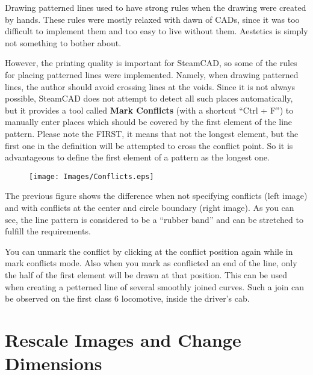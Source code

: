 Drawing patterned lines used to have strong rules when the drawing were created
by hands. These rules were mostly relaxed with dawn of CADs, since it was too
difficult to implement them and too easy to live without them. Aestetics is simply
not something to bother about.

However, the printing quality is important for SteamCAD, so some of the rules
for placing patterned lines were implemented. Namely, when drawing patterned
lines, the author should avoid crossing lines at the voids. Since it is not always
possible, SteamCAD does not attempt to detect all such places automatically, but
it provides a tool called \textbf{Mark Conflicts} (with a shortcut ``Ctrl + F'')
to manually enter places which should be covered by the first element of the
line pattern. Please note the FIRST, it means that not the longest element, but the
first one in the definition will be attempted to cross the conflict point. So
it is advantageous to define the first element of a pattern as the longest one.

\begin{figure}[h]
\begin{center}
\texttt{[image: Images/Conflicts.eps]}
\end{center}
\end{figure}

The previous figure shows the difference when not specifying conflicts (left
image) and with conflicts at the center and circle boundary (right image).
As you can see, the line pattern is considered to be a ``rubber band'' and
can be stretched to fulfill the requirements.

You can unmark the conflict by clicking at the conflict position again
while in mark conflicts mode. Also when you mark as conflicted an end of
the line, only the half of the first element will be drawn at that position.
This can be used when creating a petterned line of several smoothly joined
curves. Such a join can be observed on the first class 6 locomotive, inside
the driver's cab.

\section{Rescale Images and Change Dimensions}

